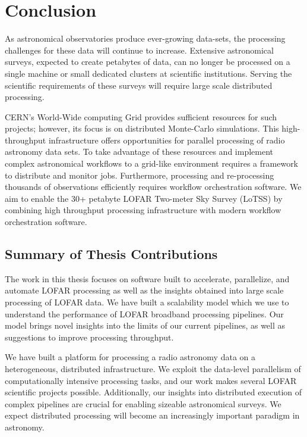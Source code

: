 \chapter{Conclusion}\label{ch:conclusions}


As astronomical observatories produce ever-growing data-sets, the processing challenges for these data will continue  to increase. Extensive astronomical surveys, expected to create petabytes of data, can no longer be processed on a single machine or small dedicated clusters at scientific institutions. Serving the scientific requirements of these surveys will require large scale distributed processing. 

CERN's World-Wide computing \gls{Grid} provides sufficient resources for such projects; however, its focus is on distributed Monte-Carlo simulations. This high-throughput infrastructure offers opportunities for parallel processing of radio astronomy data sets. To take advantage of these resources and implement complex astronomical workflows to a grid-like environment requires a framework to distribute and monitor jobs. Furthermore, processing and re-processing thousands of observations efficiently requires workflow orchestration software. We aim to enable the 30+ petabyte LOFAR Two-meter Sky Survey (\Gls{LoTSS}) by combining high throughput processing infrastructure with modern workflow orchestration software. 

\section{Summary of Thesis Contributions}

The work in this thesis focuses on software built to accelerate, parallelize, and automate LOFAR processing as well as the insights obtained into large scale processing of LOFAR data. We have built a scalability model which we use to understand the performance of LOFAR broadband processing pipelines. Our model brings novel insights into the limits of our current pipelines, as well as suggestions to improve processing throughput. 

We have built a platform for processing a radio astronomy data on a heterogeneous, distributed infrastructure. We exploit the data-level parallelism of computationally intensive processing tasks, and our work makes several LOFAR scientific projects possible. Additionally, our insights into distributed execution of complex pipelines are crucial for enabling sizeable astronomical surveys. We expect distributed processing will become an increasingly important paradigm in astronomy. 


